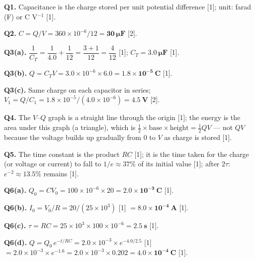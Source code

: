 \begin{markscheme}

\textbf{Q1.} Capacitance is the charge stored per unit potential difference [1]; unit: farad (F) or C V$^{-1}$ [1].

\vspace{0.5em}\textbf{Q2.} $C = Q/V = 360\times10^{-6}/12 = \mathbf{30\ \mu\text{F}}$ [2].

\vspace{0.5em}\textbf{Q3(a).} $\dfrac{1}{C_T} = \dfrac{1}{4.0} + \dfrac{1}{12} = \dfrac{3+1}{12} = \dfrac{4}{12}$ [1]; $C_T = \mathbf{3.0\ \mu\text{F}}$ [1].

\vspace{0.5em}\textbf{Q3(b).} $Q = C_T V = 3.0\times10^{-6}\times6.0 = \mathbf{1.8\times10^{-5}\ \text{C}}$ [1].

\vspace{0.5em}\textbf{Q3(c).} Same charge on each capacitor in series; $V_1 = Q/C_1 = 1.8\times10^{-5}/(4.0\times10^{-6}) = \mathbf{4.5\ \text{V}}$ [2].

\vspace{0.5em}\textbf{Q4.} The $V$–$Q$ graph is a straight line through the origin [1]; the energy is the area under this graph (a triangle), which is $\tfrac{1}{2}\times\text{base}\times\text{height} = \tfrac{1}{2}QV$ — not $QV$ because the voltage builds up gradually from 0 to $V$ as charge is stored [1].

\vspace{0.5em}\textbf{Q5.} The time constant is the product $RC$ [1]; it is the time taken for the charge (or voltage or current) to fall to $1/e \approx 37\%$ of its initial value [1]; after $2\tau$: $e^{-2} \approx \mathbf{13.5\%}$ remains [1].

\vspace{0.5em}\textbf{Q6(a).} $Q_0 = CV_0 = 100\times10^{-6}\times20 = \mathbf{2.0\times10^{-3}\ \text{C}}$ [1].

\vspace{0.5em}\textbf{Q6(b).} $I_0 = V_0/R = 20/(25\times10^3)$ [1] $= \mathbf{8.0\times10^{-4}\ \text{A}}$ [1].

\vspace{0.5em}\textbf{Q6(c).} $\tau = RC = 25\times10^3\times100\times10^{-6} = \mathbf{2.5\ \text{s}}$ [1].

\vspace{0.5em}\textbf{Q6(d).} $Q = Q_0\,e^{-t/RC} = 2.0\times10^{-3}\times e^{-4.0/2.5}$ [1] $= 2.0\times10^{-3}\times e^{-1.6} = 2.0\times10^{-3}\times0.202 = \mathbf{4.0\times10^{-4}\ \text{C}}$ [1].


\end{markscheme}
